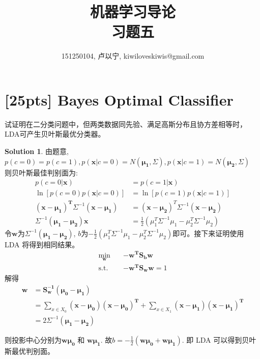 \documentclass[a4paper,UTF8]{article}
\numberwithin{equation}{section}
\theoremstyle{definition}
\newtheorem*{solution}{Solution}
\begin{document}
\title{机器学习导论\\
习题五}
\author{151250104, 卢以宁,  kiwiloveskiwis@gmail.com}
\maketitle
\section{[25pts] Bayes Optimal Classifier}
试证明在二分类问题中，但两类数据同先验、满足高斯分布且协方差相等时，LDA可产生贝叶斯最优分类器。
\begin{solution}
由题意, $p(c=0) = p(c=1), p(\mathbf{x}|c=0) = N(\mathbf{\mu_1}, \Sigma), p(\mathbf{x}|c=1) = N(\mathbf{\mu_2}, \Sigma)$ \\
则贝叶斯最佳判别面为: 
\begin{equation}
\begin{split}
p(c = 0| \mathbf{x})  &= p(c = 1 | \mathbf{x})  \\
\ln[p(c = 0) p(\mathbf{x}|c=0)] &=\ln[ p(c = 1)p(\mathbf{x}|c=1) ] \\
\mathbf{(x-\mu_1)^T} \Sigma^{-1} \mathbf{(x-\mu_1)} &= \mathbf{(x-\mu_2)}^T\Sigma^{-1} \mathbf{(x-\mu_2)} \\
\Sigma^{-1}\mathbf{(\mu_1-\mu_2)x} &= \frac{1}{2}  (\mu_1^T \Sigma^{-1} \mu_1 -  \mu_2^T \Sigma^{-1} \mu_2) %
\end{split}
\end{equation}
令$\mathbf{w}$为$\Sigma^{-1}\mathbf{(\mu_1-\mu_2)}$, $b$为$-\frac{1}{2}  (\mu_1^T \Sigma^{-1} \mu_1 -  \mu_2^T \Sigma^{-1} \mu_2)$即可。接下来证明使用 LDA 将得到相同结果。
\begin{equation}
\begin{split}
\min_{\mathbf{w}} & \quad \mathbf{-w^TS_bw} \\
\text{s.t.} & \quad \mathbf{-w^TS_ww} = 1
\end{split}
\end{equation}
解得
\begin{equation}
\begin{split}
\mathbf{w} &= \mathbf{S^{-1}_w(\mu_0 - \mu_1)}  \\
&= \sum_{x \in {X_0}} \mathbf{(x - \mu_0)(x - \mu_0)^T} + \sum_{x \in {X_1}} \mathbf{(x - \mu_1)(x - \mu_1)^T}\\
&= 2 \Sigma^{-1}\mathbf{(\mu_1-\mu_2)}
\end{split}
\end{equation}

则投影中心分别为$\mathbf{w\mu_0}$ 和 $\mathbf{w\mu_1}$. 故$b = -\frac{1}{2}(\mathbf{w\mu_0} + \mathbf{w\mu_1})$. 即 LDA 可以得到贝叶斯最优判别面。 

\end{solution}
\end{document}
